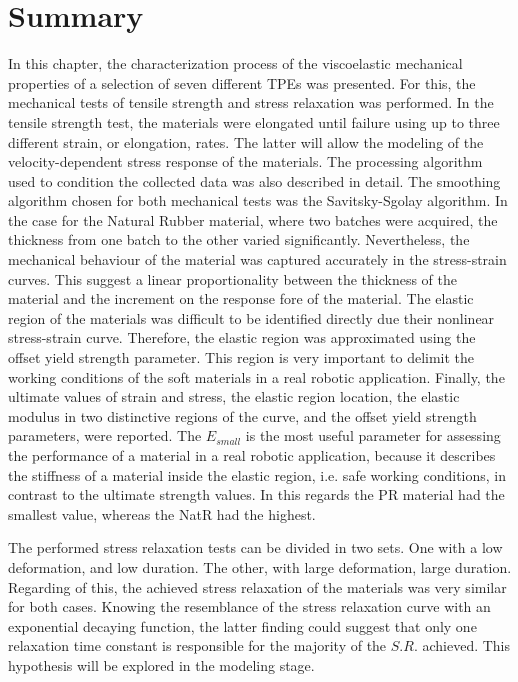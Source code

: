 
\section{Summary}

In this chapter, the characterization process of the viscoelastic mechanical properties of a selection of seven different TPEs was presented. For this, the mechanical tests of tensile strength and stress relaxation was performed. In the tensile strength test, the materials were elongated until failure using up to three different strain, or elongation, rates. The latter will allow the modeling of the velocity-dependent stress response of the materials. The processing algorithm used to condition the collected data was also described in detail. The smoothing algorithm chosen for both mechanical tests was the Savitsky-Sgolay algorithm. In the case for the Natural Rubber material, where two batches were acquired, the thickness from one batch to the other varied significantly. Nevertheless, the mechanical behaviour of the material was captured accurately in the stress-strain curves. This suggest a linear proportionality between the thickness of the material and the increment on the response fore of the material. The elastic region of the materials was difficult to be identified directly due their nonlinear stress-strain curve. Therefore, the elastic region was approximated using the offset yield strength parameter. This region is very important to delimit the working conditions of the soft materials in a real robotic application. Finally, the ultimate values of strain and stress, the elastic region location, the elastic modulus in two distinctive regions of the curve, and the offset yield strength parameters, were reported. The $E_{small}$ is the most useful parameter for assessing the performance of a material in a real robotic application, because it describes the stiffness of a material inside the elastic region, i.e. safe working conditions, in contrast to the ultimate strength values. In this regards the PR material had the smallest value, whereas the NatR had the highest.

The performed stress relaxation tests can be divided in two sets. One with a low deformation, and low duration. The other, with large deformation, large duration. Regarding of this, the achieved stress relaxation of the materials was very similar for both cases. Knowing the resemblance of the stress relaxation curve with an exponential decaying function, the latter finding could suggest that only one relaxation time constant is responsible for the majority of the $S.R.$ achieved.  This hypothesis will be explored in the modeling stage. 

